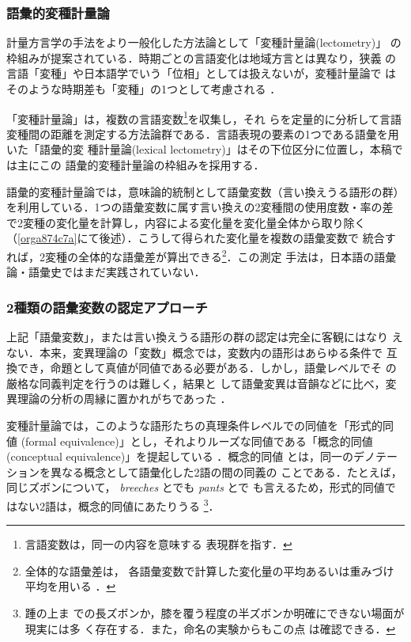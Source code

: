 \documentclass[submit]{ipsj}
\renewcommand{\ref}{\cref}
\begin{document}
\subsubsection{語彙的変種計量論\label{org9b756ab}}
\label{sec:org1a03606}
計量方言学の手法をより一般化した方法論として「変種計量論(lectometry)」
の枠組みが提案されている．時期ごとの言語変化は地域方言とは異なり，狭義
の言語「変種」や日本語学でいう「位相」としては扱えないが，変種計量論で
はそのような時期差も「変種」の1つとして考慮される
\cite{Geeraerts2023Lexical}．

「変種計量論」は，複数の言語変数\footnote{言語変数は，同一の内容を意味する
表現群を指す\cite[, 188]{Labov1972Sociolinguistic}．}を収集し，それ
らを定量的に分析して言語変種間の距離を測定する方法論群である\cite{Ruette2014Semantic}．言語表現の要素の1つである語彙を用いた「語彙的変
種計量論(lexical lectometry)」はその下位区分に位置し，本稿では主にこの
語彙的変種計量論の枠組みを採用する．

語彙的変種計量論では，意味論的統制として語彙変数（言い換えうる語形の群）
を利用している．1つの語彙変数に属す言い換えの2変種間の使用度数・率の差
で2変種の変化量を計算し，内容による変化量を変化量全体から取り除く
（\ref{orga874c7a}にて後述）．こうして得られた変化量を複数の語彙変数で
統合すれば，2変種の全体的な語彙差が算出できる\footnote{全体的な語彙差は，
各語彙変数で計算した変化量の平均あるいは重みづけ平均を用いる
\cite{Ruette2014Semantic,Speelman2003Profilebased}．}．この測定
手法は，日本語の語彙論・語彙史ではまだ実践されていない．
\subsubsection{2種類の語彙変数の認定アプローチ}
\label{sec:orgb4e1b74}
上記「語彙変数」，または言い換えうる語形の群の認定は完全に客観にはなり
えない．本来，変異理論の「変数」概念では，変数内の語形はあらゆる条件で
互換でき，命題として真値が同値である必要がある．しかし，語彙レベルでそ
の厳格な同義判定を行うのは難しく\cite{Lavandera1978Where}，結果と
して語彙変異は音韻などに比べ，変異理論の分析の周縁に置かれがちであった
\cite{DePascale2019Tokenbased}．

変種計量論では，このような語形たちの真理条件レベルでの同値を「形式的同
値 (formal equivalence)」とし，それよりルーズな同値である「概念的同値
(conceptual equivalence)」を提起している
\cite{Geeraerts2023Lexical,DePascale2019Tokenbased}．概念的同値
とは，同一のデノテーションを異なる概念として語彙化した2語の間の同義の
ことである．たとえば，同じズボンについて， \emph{breeches} とでも \emph{pants} とで
も言えるため，形式的同値ではない2語は，概念的同値にあたりうる
\cite{DePascale2019Tokenbased,Geeraerts2023Lexical}\footnote{踵の上ま
での長ズボンか，膝を覆う程度の半ズボンか明確にできない場面が現実には多
く存在する．また，命名の実験\cite{Labov1973Boundaries}からもこの点
は確認できる．}．
\end{document}
